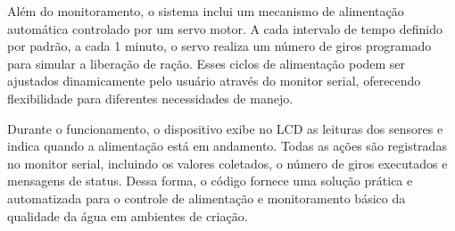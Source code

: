Além do monitoramento, o sistema inclui um mecanismo de alimentação automática controlado por um servo motor. A cada intervalo de tempo definido por padrão, a cada 1 minuto, o servo realiza um número de giros programado para simular a liberação de ração. Esses ciclos de alimentação podem ser ajustados dinamicamente pelo usuário através do monitor serial, oferecendo flexibilidade para diferentes necessidades de manejo.

Durante o funcionamento, o dispositivo exibe no LCD as leituras dos sensores e indica quando a alimentação está em andamento. Todas as ações são registradas no monitor serial, incluindo os valores coletados, o número de giros executados e mensagens de status. Dessa forma, o código fornece uma solução prática e automatizada para o controle de alimentação e monitoramento básico da qualidade da água em ambientes de criação.

